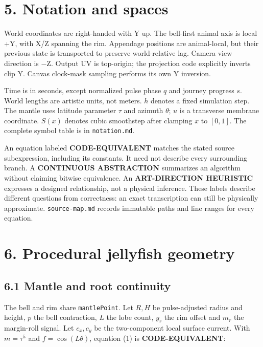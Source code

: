 \documentclass[
  english,
  11pt,
]{article}
\begin{document}
\section{5. Notation and spaces}\label{notation-and-spaces}

World coordinates are right-handed with Y up. The bell-first animal axis
is local +Y, with X/Z spanning the rim. Appendage positions are
animal-local, but their previous state is transported to preserve
world-relative lag. Camera view direction is −Z. Output UV is
top-origin; the projection code explicitly inverts clip Y. Canvas
clock-mask sampling performs its own Y inversion.

Time is in seconds, except normalized pulse phase \(q\) and journey
progress \(s\). World lengths are artistic units, not meters. \(h\)
denotes a fixed simulation step. The mantle uses latitude parameter
\(\tau\) and azimuth \(\theta\); \(u\) is a transverse membrane
coordinate. \(S(x)\) denotes cubic smoothstep after clamping \(x\) to
\([0,1]\). The complete symbol table is in \texttt{notation.md}.

An equation labeled \textbf{CODE-EQUIVALENT} matches the stated source
subexpression, including its constants. It need not describe every
surrounding branch. A \textbf{CONTINUOUS ABSTRACTION} summarizes an
algorithm without claiming bitwise equivalence. An \textbf{ART-DIRECTION
HEURISTIC} expresses a designed relationship, not a physical inference.
These labels describe different questions from correctness: an exact
transcription can still be physically approximate.
\texttt{source-map.md} records immutable paths and line ranges for every
equation.

\section{6. Procedural jellyfish
geometry}\label{procedural-jellyfish-geometry}

\subsection{6.1 Mantle and root
continuity}\label{mantle-and-root-continuity}

The bell and rim share \texttt{mantlePoint}. Let \(R,H\) be
pulse-adjusted radius and height, \(p\) the bell contraction, \(L\) the
lobe count, \(y_r\) the rim offset and \(m_r\) the margin-roll signal.
Let \(c_x,c_y\) be the two-component local surface current. With
\(m=\tau^5\) and \(f=\cos(L\theta)\), equation (1) is
\textbf{CODE-EQUIVALENT}:
\end{document}
